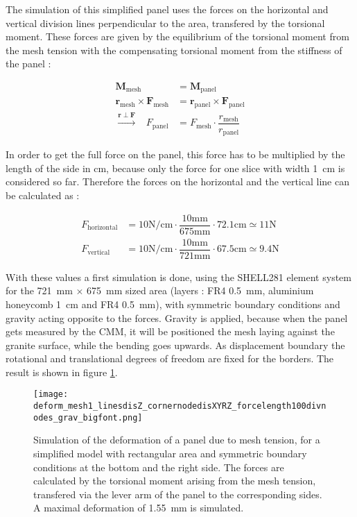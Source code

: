 \documentclass[
a4paper,                                %
twoside,                                %
BCOR1.4cm,                      %
10pt,                           %
headings=normal,                %
headsepline,                    %
clearplainpage, %
final,                                  %
div=14,
parskip=full,
openright,
bibliography=toc
]{scrreprt}
\begin{document}
The simulation of this simplified panel uses the forces on the horizontal and vertical division lines perpendicular to the area, transfered by the torsional moment. These forces are given by the equilibrium of the torsional moment from the mesh tension with the compensating torsional moment from the stiffness of the panel : 

\begin{align}
	\boldsymbol{M}_{\mathrm{mesh}} &= \boldsymbol{M}_{\mathrm{panel}}
	\nonumber
	\\
	\boldsymbol{r}_{\mathrm{mesh}} \times \boldsymbol{F}_{\mathrm{mesh}} &= \boldsymbol{r}_{\mathrm{panel}} \times \boldsymbol{F}_{\mathrm{panel}} 
	\nonumber
	\\
	\stackrel{\boldsymbol{r}\perp\boldsymbol{F}}\rightarrow \;\;\; F_{\mathrm{panel}} &= F_{\mathrm{mesh}} \cdot \dfrac{r_{\mathrm{mesh}}}{r_{\mathrm{panel}}}
	\label{bendingForce}
\end{align}

In order to get the full force on the panel, this force has to be multiplied by the length of the side in cm, because only the force for one slice with width \SI{1}{\cm} is considered so far. Therefore the forces on the horizontal and the vertical line can be calculated as :

\begin{align*}
	F_{\mathrm{horizontal}} &= 10\mathrm{N/cm} \cdot \dfrac{10\mathrm{mm}}{675\mathrm{mm}} \cdot 72.1\mathrm{cm} \simeq 11\mathrm{N} 
	\\
	F_{\mathrm{vertical}} &= 10\mathrm{N/cm} \cdot \dfrac{10\mathrm{mm}}{721\mathrm{mm}} \cdot 67.5\mathrm{cm} \simeq 9.4\mathrm{N}
\end{align*}

With these values a first simulation is done, using the SHELL281 element system for the \SI{721}{\mm} $\times$ \SI{675}{\mm} sized area (layers : FR4 \SI{0.5}{mm}, aluminium honeycomb \SI{1}{cm} and FR4 \SI{0.5}{mm}), with symmetric boundary conditions and gravity acting opposite to the forces. Gravity is applied, because when the panel gets measured by the CMM, it will be positioned the mesh laying against the granite surface, while the bending goes upwards. As displacement boundary the rotational and translational degrees of freedom are fixed for the borders. The result is shown in figure \ref{deformMeshSim1}.

\begin{figure}[H]
	\centering
	\texttt{[image: deform\_mesh1\_linesdisZ\_cornernodedisXYRZ\_forcelength100divnodes\_grav\_bigfont.png]}
	\caption{Simulation of the deformation of a panel due to mesh tension, for a simplified model with rectangular area and symmetric boundary conditions at the bottom and the right side. The forces are calculated by the torsional moment arising from the mesh tension, transfered via the lever arm of the panel to the corresponding sides. A maximal deformation of \SI{1.55}{\mm} is simulated.}
	\label{deformMeshSim1}
\end{figure}
\end{document}

